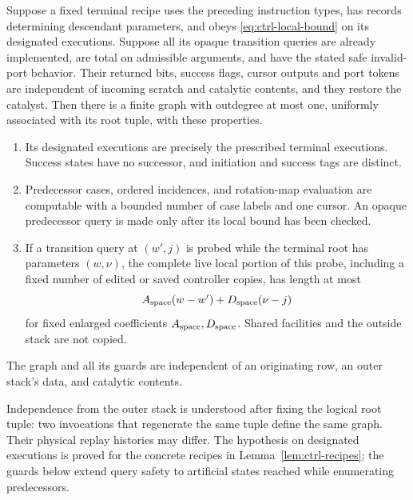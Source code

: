 \begin{lemma}\label{lem:ctrl-local-graph}
Suppose a fixed terminal recipe uses the preceding instruction types,
has records determining descendant parameters, and obeys
\eqref{eq:ctrl-local-bound} on its designated executions.  Suppose all
its opaque transition queries are already implemented, are total on
admissible arguments, and have the stated safe invalid-port behavior.
Their returned bits, success flags, cursor outputs and port tokens are
independent of incoming scratch and catalytic contents, and they restore
the catalyst.  Then there is a finite graph with outdegree at
most one, uniformly associated with its root tuple, with these
properties.
\begin{enumerate}
\item Its designated executions are precisely the prescribed terminal
  executions.  Success states have no successor, and initiation and
  success tags are distinct.
\item Predecessor cases, ordered incidences, and rotation-map evaluation
  are computable with a bounded number of case labels and one cursor.
  An opaque predecessor query is made only after its local bound has
  been checked.
\item If a transition query at $(w',j)$ is probed while the terminal
  root has parameters $(w,\nu)$, the complete live local portion of this
  probe, including a fixed number of edited or saved controller copies,
  has length at most
  \begin{equation}\label{eq:ctrl-neighbor-bound}
  A_{\rm space}(w-w')+D_{\rm space}(\nu-j)
  \end{equation}
  for fixed enlarged coefficients $A_{\rm space},D_{\rm space}$.  Shared facilities and the
  outside stack are not copied.
\end{enumerate}
The graph and all its guards are independent of an originating row,
an outer stack's data, and catalytic contents.
\end{lemma}

Independence from the outer stack is understood after fixing the logical
root tuple: two invocations that regenerate the same tuple define the
same graph.  Their physical replay histories may differ.  The hypothesis
on designated executions is proved for the concrete recipes in
Lemma~\ref{lem:ctrl-recipes}; the guards below extend query safety to
artificial states reached while enumerating predecessors.

